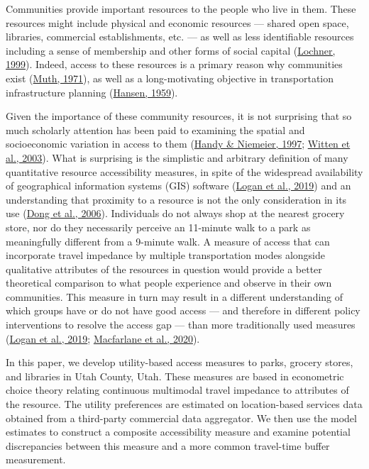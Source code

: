 \documentclass[review, 3p]{elsarticle} %
\begin{document}
Communities provide important resources to the people who live in them. These
resources might include physical and economic resources
--- shared open space, libraries, commercial establishments, etc. --- as well as less identifiable resources
including a sense of membership and other forms of social capital
(\protect\hyperlink{ref-lochner1999}{Lochner, 1999}). Indeed, access to these resources is a primary reason why
communities exist (\protect\hyperlink{ref-muth1971}{Muth, 1971}), as well as a long-motivating objective in
transportation infrastructure planning (\protect\hyperlink{ref-hansen1959}{Hansen, 1959}).

Given the importance of these community resources, it is not surprising that
so much scholarly attention has been paid to examining the spatial and
socioeconomic variation in access to them (\protect\hyperlink{ref-handy1997}{Handy \& Niemeier, 1997}; \protect\hyperlink{ref-witten2003}{Witten et al., 2003}). What
is surprising is the simplistic and arbitrary definition of many
quantitative resource accessibility measures, in spite of the widespread
availability of geographical information systems (GIS) software (\protect\hyperlink{ref-logan2019}{Logan et al., 2019}) and
an understanding that proximity to a resource is not the only consideration
in its use (\protect\hyperlink{ref-dong2006}{Dong et al., 2006}). Individuals do not always shop at the nearest grocery
store, nor do they necessarily perceive an 11-minute walk to a park as
meaningfully different from a 9-minute walk. A measure of access that can
incorporate travel impedance by multiple transportation modes alongside
qualitative attributes of the resources in question would provide a better
theoretical comparison to what people experience and observe in their own
communities. This measure in turn may result in a different understanding
of which groups have or do not have good access --- and therefore in different
policy interventions to resolve the access gap --- than more traditionally used
measures (\protect\hyperlink{ref-logan2019}{Logan et al., 2019}; \protect\hyperlink{ref-macfarlane2020}{Macfarlane et al., 2020}).

In this paper, we develop utility-based access measures to parks, grocery stores, and
libraries in Utah County, Utah. These measures are based in econometric choice
theory relating continuous multimodal travel impedance to attributes of the
resource. The utility preferences are estimated on location-based services data
obtained from a third-party commercial data aggregator. We then use the model
estimates to construct a composite accessibility measure and examine potential
discrepancies between this measure and a more common travel-time buffer
measurement.
\end{document}
